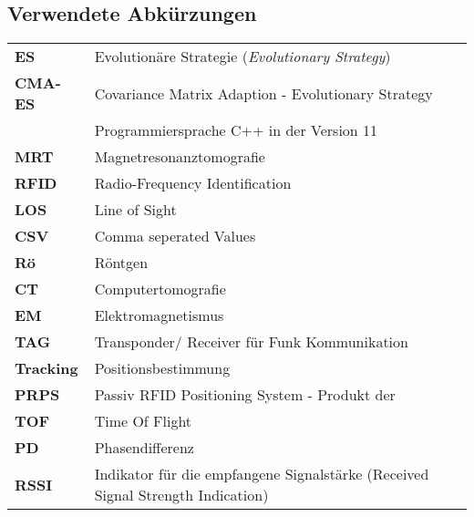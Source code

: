 \newpage
%
\subsection*{Verwendete Abkürzungen}
%
\begin{table} [H]
	\begin{center}
		\begin{tabular}{p{25mm}p{95mm}}
		      	\textbf{ES} & Evolutionäre Strategie (\textit{Evolutionary Strategy})\\
		      	\textbf{CMA-ES}  & Covariance Matrix Adaption - Evolutionary Strategy\\
		      	\textbf{\cpp11} & Programmiersprache C++ in der Version 11\\
		      	\textbf{MRT}	& Magnetresonanztomografie\\
		      	\textbf{RFID} & Radio-Frequency Identification\\
		      	\textbf{LOS} & Line of Sight\\
		      	\textbf{CSV} & Comma seperated Values\\
		      	\textbf{Rö} & Röntgen\\
		      	\textbf{CT} & Computertomografie\\
		      	\textbf{EM} & Elektromagnetismus\\
		      	\textbf{TAG} & Transponder/ Receiver für Funk Kommunikation\\
		      	\textbf{Tracking} & Positionsbestimmung\\
		      	\textbf{PRPS} & Passiv RFID Positioning System - Produkt der \amedogmbh \\
		      	\textbf{TOF} & Time Of Flight\\
		      	\textbf{PD} & Phasendifferenz\\
		      	\textbf{RSSI} & Indikator für die empfangene Signalstärke (Received Signal Strength Indication)\\
%		      	
		\end{tabular}
	\end{center}
\end{table}

